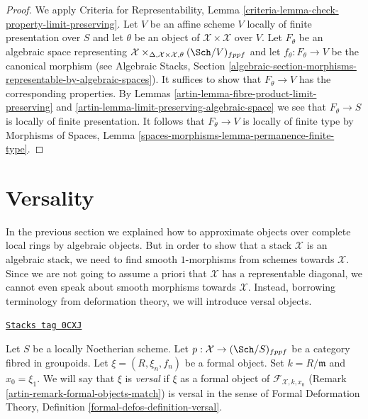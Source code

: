 \begin{proof}

We apply Criteria for Representability, Lemma
\ref{criteria-lemma-check-property-limit-preserving}.
Let $V$ be an affine scheme $V$ locally of finite presentation over $S$
and let $\theta$ be an object of $\mathcal{X} \times \mathcal{X}$
over $V$. Let $F_\theta$ be an algebraic space representing
$\mathcal{X} \times_{\Delta, \mathcal{X} \times \mathcal{X}, \theta}
(\Sch/V)_{fppf}$ and let $f_\theta : F_\theta \to V$ be the canonical morphism
(see Algebraic Stacks, Section
\ref{algebraic-section-morphisms-representable-by-algebraic-spaces}).
It suffices to show that
$F_\theta \to V$ has the corresponding properties. By
Lemmas \ref{artin-lemma-fibre-product-limit-preserving} and
\ref{artin-lemma-limit-preserving-algebraic-space}
we see that $F_\theta \to S$ is locally of finite presentation.
It follows that $F_\theta \to V$ is locally of finite type
by Morphisms of Spaces, Lemma
\ref{spaces-morphisms-lemma-permanence-finite-type}.
\end{proof}

\section{Versality}
\label{artin-section-versality}
In the previous section we explained how to approximate objects over
complete local rings by algebraic objects. But in order to show that
a stack $\mathcal{X}$ is an algebraic stack, we need to find smooth
$1$-morphisms from schemes towards $\mathcal{X}$. Since we are not going
to assume a priori that $\mathcal{X}$ has a representable diagonal, we
cannot even speak about smooth morphisms towards $\mathcal{X}$. Instead,
borrowing terminology from deformation theory, we will introduce versal
objects.

\begin{definition}
\label{artin-definition-versal-formal-object}
\href{https://stacks.math.columbia.edu/tag/0CXJ}{\texttt{Stacks tag 0CXJ}}

Let $S$ be a locally Noetherian scheme. Let
$p : \mathcal{X} \to (\Sch/S)_{fppf}$ be a category fibred in groupoids.
Let $\xi = (R, \xi_n, f_n)$ be a formal object. Set $k = R/\mathfrak m$ and
$x_0 = \xi_1$. We will say that $\xi$ is {\it versal} if $\xi$
as a formal object of $\mathcal{F}_{\mathcal{X}, k, x_0}$
(Remark \ref{artin-remark-formal-objects-match}) is versal in the sense
of Formal Deformation Theory, Definition \ref{formal-defos-definition-versal}.
\end{definition}

